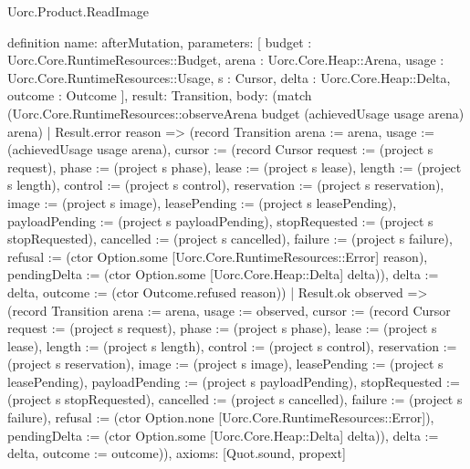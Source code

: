 \begin{lexlean}{Uorc.Product.ReadImage}
\begin{semanticmodule}
definition{
  name: afterMutation,
  parameters: [
    budget : Uorc.Core.RuntimeResources::Budget,
    arena : Uorc.Core.Heap::Arena,
    usage : Uorc.Core.RuntimeResources::Usage,
    s : Cursor,
    delta : Uorc.Core.Heap::Delta,
    outcome : Outcome
  ],
  result: Transition,
  body: (match (Uorc.Core.RuntimeResources::observeArena budget (achievedUsage usage arena) arena)
    | Result.error reason => (record Transition {arena := arena, usage := (achievedUsage usage arena), cursor := (record Cursor {request := (project s request), phase := (project s phase), lease := (project s lease), length := (project s length), control := (project s control), reservation := (project s reservation), image := (project s image), leasePending := (project s leasePending), payloadPending := (project s payloadPending), stopRequested := (project s stopRequested), cancelled := (project s cancelled), failure := (project s failure), refusal := (ctor Option.some [Uorc.Core.RuntimeResources::Error] reason), pendingDelta := (ctor Option.some [Uorc.Core.Heap::Delta] delta)}), delta := delta, outcome := (ctor Outcome.refused reason)})
    | Result.ok observed => (record Transition {arena := arena, usage := observed, cursor := (record Cursor {request := (project s request), phase := (project s phase), lease := (project s lease), length := (project s length), control := (project s control), reservation := (project s reservation), image := (project s image), leasePending := (project s leasePending), payloadPending := (project s payloadPending), stopRequested := (project s stopRequested), cancelled := (project s cancelled), failure := (project s failure), refusal := (ctor Option.none [Uorc.Core.RuntimeResources::Error]), pendingDelta := (ctor Option.some [Uorc.Core.Heap::Delta] delta)}), delta := delta, outcome := outcome})),
  axioms: [Quot.sound, propext]
}


\end{semanticmodule}
\end{lexlean}
